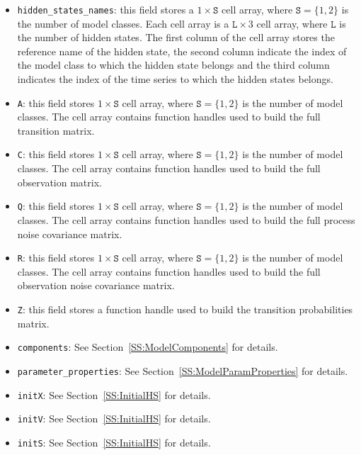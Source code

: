 \begin{itemize}
\item \lstinline[basicstyle = \mlttfamily \small ]!hidden_states_names!:  this field stores a $1\times \mathtt{S}$ cell array, where $\mathtt{S} = \{1,2 \}$ is the number of model classes.
Each cell array is a $ \mathtt{L} \times 3$ cell array, where $\mathtt{L}$ is the number of hidden states. The first column of the cell array stores the reference name of the hidden state, the second column indicate the index of the model class to which the hidden state belongs and the third column indicates the index of the time series to which the hidden states belongs.
\item \lstinline[basicstyle = \mlttfamily \small ]!A!:  this field stores $1\times \mathtt{S}$ cell array, where $\mathtt{S} = \{1,2 \}$ is the number of model classes. The cell array contains function handles used to build the full transition matrix.
\item \lstinline[basicstyle = \mlttfamily \small ]!C!:  this field stores $1\times \mathtt{S}$ cell array, where $\mathtt{S} = \{1,2 \}$ is the number of model classes. The cell array contains function handles used to build the full observation matrix.
\item \lstinline[basicstyle = \mlttfamily \small ]!Q!: this field stores $1\times \mathtt{S}$ cell array, where $\mathtt{S} = \{1,2 \}$ is the number of model classes. The cell array contains function handles used to build the full process noise covariance matrix.
\item \lstinline[basicstyle = \mlttfamily \small ]!R!:  this field stores $1\times \mathtt{S}$ cell array, where $\mathtt{S} = \{1,2 \}$ is the number of model classes. The cell array contains function handles used to build the full observation noise covariance matrix.
\item \lstinline[basicstyle = \mlttfamily \small ]!Z!:  this field stores a function handle used to build the transition probabilities matrix.
\item \lstinline[basicstyle = \mlttfamily \small ]!components!:   See Section~\ref{SS:ModelComponents} for details.
\item \lstinline[basicstyle = \mlttfamily \small ]!parameter_properties!: See Section~\ref{SS:ModelParamProperties} for details.
\item \lstinline[basicstyle = \mlttfamily \small ]!initX!: See Section~\ref{SS:InitialHS} for details.
\item \lstinline[basicstyle = \mlttfamily \small ]!initV!: See Section~\ref{SS:InitialHS} for details.
\item \lstinline[basicstyle = \mlttfamily \small ]!initS!: See Section~\ref{SS:InitialHS} for details.
\end{itemize}


